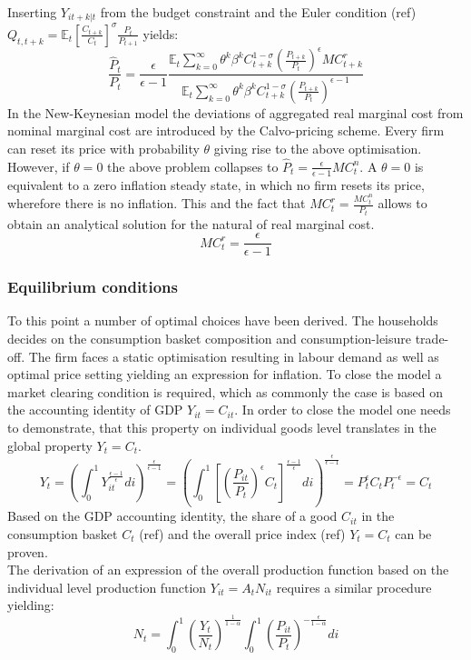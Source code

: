 \documentclass[12pt,a4paper,english]{article} %
\newcommand{\E}{\mathbb{E}} %
\begin{document}
	Inserting $Y_{it+k|t}$ from the budget constraint and the Euler condition (ref) $Q_{t,t+k} = \E_t \left[ \frac{C_{t+k}}{C_t} \right]^\sigma \frac{P_t}{P_{t+1}}$ yields:
	\begin{equation}
		\frac{\hat{P}_t}{P_t} = \frac{\epsilon}{\epsilon-1} 
		\frac{
		\E_t \sum_{k=0}^{\infty} \theta^k \beta^k C_{t+k}^{1-\sigma} (\frac{P_{t+k}}{P_t})^\epsilon MC_{t+k}^r
		}{
		\E_t \sum_{k=0}^{\infty} \theta^k \beta^k C_{t+k}^{1-\sigma} (\frac{P_{t+k}}{P_t})^{\epsilon-1}
		}
	\end{equation}
	In the New-Keynesian model the deviations of aggregated real marginal cost from nominal marginal cost are introduced by the Calvo-pricing scheme. Every firm can reset its price with probability $\theta$ giving rise to the above optimisation. However, if $\theta=0$ the above problem collapses to $\hat{P}_t = \frac{\epsilon}{\epsilon-1} MC_t^n$. A $\theta=0$ is equivalent to a zero inflation steady state, in which no firm resets its price, wherefore there is no inflation. This and the fact that $MC_t^r = \frac{MC_t^n}{P_t}$ allows to obtain an analytical solution for the natural of real marginal cost. 
	\begin{equation}
		MC_t^r = \frac{\epsilon}{\epsilon-1}
	\end{equation} 
	
	
	\subsubsection{Equilibrium conditions}
	To this point a number of optimal choices have been derived. The households decides on the consumption basket composition and consumption-leisure trade-off. The firm faces a static optimisation resulting in labour demand as well as optimal price setting yielding an expression for inflation. To close the model a market clearing condition is required, which as commonly the case is based on the accounting identity of GDP $Y_{it} = C_{it}$. In order to close the model one needs to demonstrate, that this property on individual goods level translates in the global property $Y_t = C_t$.
	\begin{equation}
			Y_t = 
			\left( 
				\int_{0}^{1} Y_{it}^{\frac{\epsilon - 1}{\epsilon}} di 
			\right)^{\frac{\epsilon}{\epsilon - 1}}
			=
			\left( 
			\int_{0}^{1} 
			\left[
			\left( \frac{P_{it}}{P_t} \right)^\epsilon C_t
			\right]^{\frac{\epsilon - 1}{\epsilon}} di 
			\right)^{\frac{\epsilon}{\epsilon - 1}}
			=
			P_t^{\epsilon} C_t P_t^{-\epsilon}
			=
			C_t
	\end{equation}
	Based on the GDP accounting identity, the share of a good $C_{it}$ in the consumption basket $C_t$ (ref) and the overall price index (ref) $Y_t = C_t$ can be proven.\\
	The derivation of an expression of the overall production function based on the individual level production function $Y_{it} = A_t N_{it}$ requires a similar procedure yielding:
	\begin{equation}
		N_t = 	
		\int_{0}^{1} \left( \frac{Y_t}{N_t} \right)^{\frac{1}{1 - \alpha}}
		\int_{0}^{1} \left( \frac{P_{it}}{P_t} \right)^{-\frac{\epsilon}{1 - \alpha}} di
	\end{equation}
	
\end{document}
